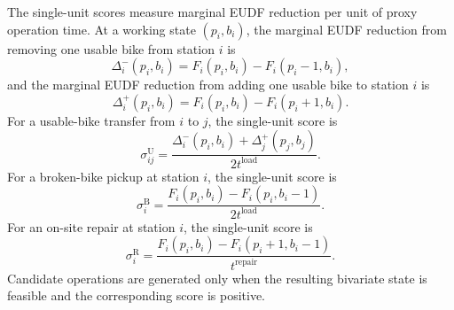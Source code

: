 The single-unit scores measure marginal EUDF reduction per unit of proxy
operation time. At a working state $(p_i,b_i)$, the marginal EUDF reduction from
removing one usable bike from station $i$ is
\begin{equation}
\Delta_i^{-}(p_i,b_i)=F_i(p_i,b_i)-F_i(p_i-1,b_i),
\label{eq:eats-remove-usable-marginal}
\end{equation}
and the marginal EUDF reduction from adding one usable bike to station $i$ is
\begin{equation}
\Delta_i^{+}(p_i,b_i)=F_i(p_i,b_i)-F_i(p_i+1,b_i).
\label{eq:eats-add-usable-marginal}
\end{equation}
For a usable-bike transfer from $i$ to $j$, the single-unit score is
\begin{equation}
\sigma_{ij}^{\mathrm U}
=\frac{\Delta_i^{-}(p_i,b_i)+\Delta_j^{+}(p_j,b_j)}
{2t^{\mathrm{load}}}.
\label{eq:eats-usable-score}
\end{equation}
For a broken-bike pickup at station $i$, the single-unit score is
\begin{equation}
\sigma_i^{\mathrm B}
=\frac{F_i(p_i,b_i)-F_i(p_i,b_i-1)}{2t^{\mathrm{load}}}.
\label{eq:eats-broken-pickup-score}
\end{equation}
For an on-site repair at station $i$, the single-unit score is
\begin{equation}
\sigma_i^{\mathrm R}
=\frac{F_i(p_i,b_i)-F_i(p_i+1,b_i-1)}{t^{\mathrm{repair}}}.
\label{eq:eats-repair-score}
\end{equation}
Candidate operations are generated only when the resulting bivariate state is
feasible and the corresponding score is positive.

